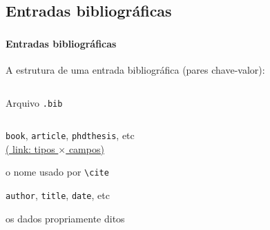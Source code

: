 \documentclass[handout,10pt]{beamer}
\begin{document}
\subsection{Entradas bibliográficas}
\begin{frame}[fragile]
	\frametitle{\bibtex}
	\framesubtitle{Entradas bibliográficas}

	A estrutura de uma entrada bibliográfica (pares chave-valor):
	
	\begin{columns}
		\centering
		\begin{block}{\begin{center}Arquivo \texttt{.bib}\end{center}}
			\centering
			\usebox{\bibentry}
		\end{block}
	\end{columns}
	
	\begin{description}
		\item<2->[\textit{tipo}] \texttt{book}, \texttt{article}, \texttt{phdthesis},
		etc\\ \hyperlink{tiposXcampos}{\footnotesize\color{blue}(%
		link: tipos $\times$ campos)}
		
		\item<3->[\textit{rótulo}] o nome usado por \verb|\cite|
		\item<4->[\textit{campo}] \texttt{author}, \texttt{title}, \texttt{date}, etc
		\item<5->[\textit{valor}] os dados propriamente ditos
	\end{description}
	
\end{frame}
\end{document}
